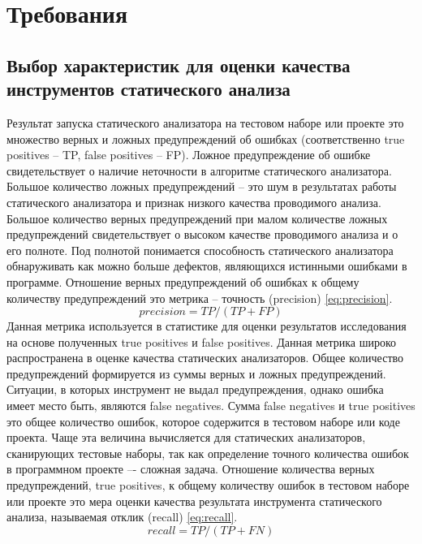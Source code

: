 \chapter{Требования}\label{ch:ch2}

\section{Выбор характеристик для оценки качества инструментов статического анализа}\label{sec:ch2/sec1}
Результат запуска статического анализатора на тестовом наборе или проекте это множество верных и ложных предупреждений об ошибках (соответственно
true positives -- TP, false positives -- FP). Ложное предупреждение об ошибке свидетельствует о наличие неточности в алгоритме статического анализатора. Большое
количество ложных предупреждений -- это шум в результатах работы статического анализатора и признак низкого качества проводимого анализа. Большое
количество верных предупреждений при малом количестве ложных предупреждений свидетельствует о высоком качестве проводимого анализа и о его полноте.
Под полнотой понимается способность статического анализатора обнаруживать
как можно больше дефектов, являющихся истинными ошибками в программе. Отношение верных предупреждений об ошибках
к общему количеству предупреждений это метрика -- точность (precision) \eqref{eq:precision}. 
\begin{equation}\label{eq:precision}
precision = TP/(TP + FP)
\end{equation}
Данная метрика используется в статистике для оценки результатов исследования на основе полученных true positives и false positives. Данная метрика широко распространена в
оценке качества статических анализаторов. 
Общее количество предупреждений
формируется из суммы верных и ложных предупреждений. Ситуации, в которых инструмент не выдал предупреждения, однако ошибка имеет место быть,
являются false negatives. Сумма false negatives и true positives это общее количество ошибок, которое содержится в тестовом наборе или коде проекта. Чаще
эта величина вычисляется для статических анализаторов, сканирующих тестовые наборы, так как определение точного количества ошибок в программном
проекте –- сложная задача. Отношение количества верных предупреждений, true positives, к
общему количеству ошибок в тестовом наборе или проекте это мера оценки качества результата инструмента статического анализа, называемая отклик (recall) \eqref{eq:recall}. 
\begin{equation}\label{eq:recall}
recall = TP/(TP+FN)
\end{equation}
